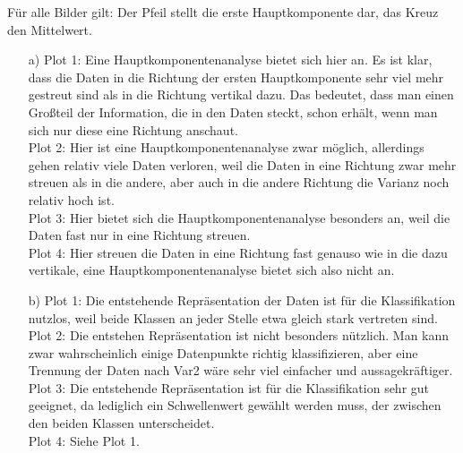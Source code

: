 \documentclass[a4paper]{scrartcl}
\newcounter{punkte}
\begin{document}
Für alle Bilder gilt: Der Pfeil stellt die erste Hauptkomponente dar, das Kreuz den Mittelwert.\\
\begin{enumerate}
	\item[a)] Plot 1: Eine Hauptkomponentenanalyse bietet sich hier an. Es ist klar, dass die Daten in die Richtung der ersten Hauptkomponente sehr viel mehr gestreut sind als in die Richtung vertikal dazu. Das bedeutet, dass man einen Großteil der Information, die in den Daten steckt, schon erhält, wenn man sich nur diese eine Richtung anschaut.\\
	Plot 2: Hier ist eine Hauptkomponentenanalyse zwar möglich, allerdings gehen relativ viele Daten verloren, weil die Daten in eine Richtung zwar mehr streuen als in die andere, aber auch in die andere Richtung die Varianz noch relativ hoch ist.\\
	Plot 3: Hier bietet sich die Hauptkomponentenanalyse besonders an, weil die Daten fast nur in eine Richtung streuen.\\
	Plot 4: Hier streuen die Daten in eine Richtung fast genauso wie in die dazu vertikale, eine Hauptkomponentenanalyse bietet sich also nicht an.
	\item[b)] Plot 1: Die entstehende Repräsentation der Daten ist für die Klassifikation nutzlos, weil beide Klassen an jeder Stelle etwa gleich stark vertreten sind.\\
	Plot 2: Die entstehen Repräsentation ist nicht besonders nützlich. Man kann zwar wahrscheinlich einige Datenpunkte richtig klassifizieren, aber eine Trennung der Daten nach Var2 wäre sehr viel einfacher und aussagekräftiger.\\
	Plot 3: Die entstehende Repräsentation ist für die Klassifikation sehr gut geeignet, da lediglich ein Schwellenwert gewählt werden muss, der zwischen den beiden Klassen unterscheidet.\\
	Plot 4: Siehe Plot 1.
\end{enumerate}
\end{document}
